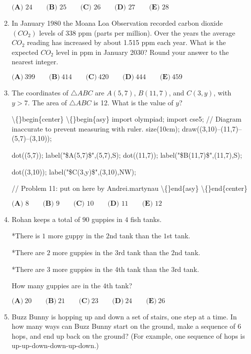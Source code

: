 \documentclass{article}
\begin{document}
\begin{enumerate}[label=\arabic*., itemsep=0.5em]
\(\textbf{(A) } 24\qquad\textbf{(B) } 25\qquad\textbf{(C) } 26\qquad\textbf{(D) } 27\qquad\textbf{(E) } 28\)\par \vspace{0.5em}\item In January 1980 the Moana Loa Observation recorded carbon dioxide \((CO_2)\) levels of 338 ppm (parts per million). Over the years the average \(CO_2\) reading has increased by about 1.515 ppm each year. What is the expected \(CO_2\) level in ppm in January 2030? Round your answer to the nearest integer.

\(\textbf{(A)}\ 399 \qquad \textbf{(B)}\ 414 \qquad \textbf{(C)}\ 420 \qquad \textbf{(D)}\ 444 \qquad \textbf{(E)}\ 459\)\par \vspace{0.5em}\item The coordinates of \(\triangle ABC\) are \(A(5,7)\), \(B(11,7)\), and \(C(3,y)\), with \(y>7\). The area of \(\triangle ABC\) is 12. What is the value of \(y\)?


\textbackslash\{\}begin\{center\}
\textbackslash\{\}begin\{asy\}
import olympiad;
import cse5;
// Diagram inaccurate to prevent measuring with ruler.
size(10cm);
draw((3,10)--(11,7)--(5,7)--(3,10));

dot((5,7));
label("\$A(5,7)\$",(5,7),S);
dot((11,7));
label("\$B(11,7)\$",(11,7),S);

dot((3,10));
label("\$C(3,y)\$",(3,10),NW);

// Problem 11: put on here by Andrei.martynau
\textbackslash\{\}end\{asy\}
\textbackslash\{\}end\{center\}


\(\textbf{(A) }8\qquad\textbf{(B) }9\qquad\textbf{(C) }10\qquad\textbf{(D) }11\qquad \textbf{(E) }12\)\par \vspace{0.5em}\item Rohan keeps a total of \(90\) guppies in \(4\) fish tanks.

*There is \(1\) more guppy in the \(2\)nd tank than the \(1\)st tank.

*There are \(2\) more guppies in the 3rd tank than the \(2\)nd tank.

*There are \(3\) more guppies in the 4th tank than the \(3\)rd tank. 

How many guppies are in the \(4\)th tank?

\(\textbf{(A)}\ 20 \qquad \textbf{(B)}\ 21 \qquad \textbf{(C)}\ 23 \qquad \textbf{(D)}\ 24 \qquad \textbf{(E)}\ 26\)\par \vspace{0.5em}\item Buzz Bunny is hopping up and down a set of stairs, one step at a time. In how many ways can Buzz Bunny start on the ground, make a sequence of \(6\) hops, and end up back on the ground?
(For example, one sequence of hops is up-up-down-down-up-down.)



\end{enumerate}
\end{document}
